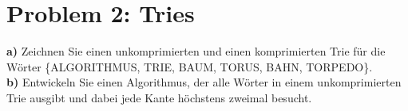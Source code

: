 \section*{Problem 2: Tries}


\noindent
\textbf{a)} Zeichnen Sie einen unkomprimierten und einen komprimierten Trie für die Wörter \{ALGORITHMUS, TRIE, BAUM, TORUS, BAHN, TORPEDO\}.\\


\noindent
\textbf{b)} Entwickeln Sie einen Algorithmus, der alle Wörter in einem unkomprimierten Trie ausgibt und dabei jede Kante höchstens zweimal besucht.\\